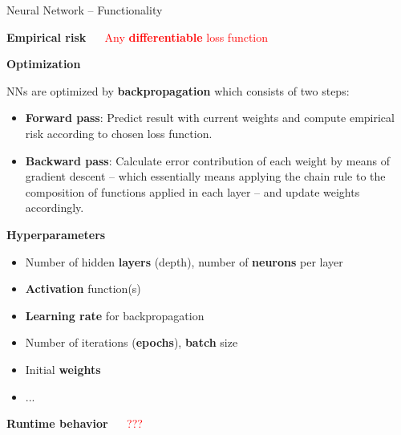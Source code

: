 \documentclass[11pt,compress,t,notes=noshow, xcolor=table]{beamer}
\newcommand{\highlight}[1]{\textcolor{highlightcol}{\textbf{#1}}}
\begin{document}

\begin{frame}{Neural Network -- Functionality}

\footnotesize

\highlight{Empirical risk} ~~
\textcolor{red}{Any \textbf{differentiable} loss function}

\medskip

\highlight{Optimization}

NNs are optimized by \textbf{backpropagation} which consists of two steps:
\begin{itemize}
  \item \textbf{Forward pass}: Predict result with current weights and 
  compute empirical risk according to chosen loss function. 
  \item \textbf{Backward pass}: Calculate error contribution of each weight by 
  means of gradient descent -- which essentially means applying the chain rule
  to the composition of functions applied in each layer -- and update weights 
  accordingly. 
\end{itemize}

\medskip

\highlight{Hyperparameters}

\begin{itemize}
  \item Number of hidden \textbf{layers} (depth), number of \textbf{neurons} 
  per layer
  \item \textbf{Activation} function(s)
  \item \textbf{Learning rate} for backpropagation
  \item Number of iterations (\textbf{epochs}), \textbf{batch} size
  \item Initial \textbf{weights} 
  \item ...
\end{itemize}

\medskip

\highlight{Runtime behavior} ~~ \textcolor{red}{???}

\end{frame}

\end{document}
